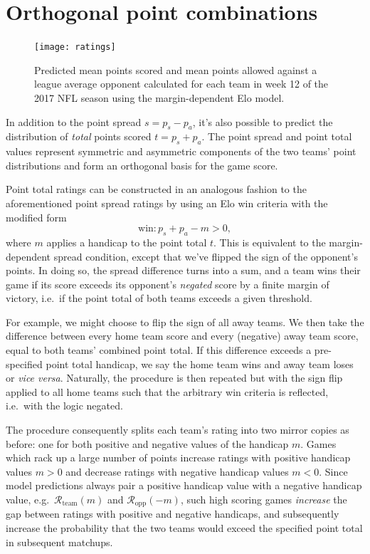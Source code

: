 \documentclass[aps,prc,reprint,amsmath,superscriptaddress]{revtex4-1}
\begin{document}
\section{Orthogonal point combinations}

\begin{figure}
  \texttt{[image: ratings]}
  \caption{\label{fig:ratings} Predicted mean points scored and mean points allowed against a league average opponent calculated for each team in week 12 of the 2017 NFL season using the margin-dependent Elo model.}
\end{figure}

In addition to the point spread $s = p_s - p_a$, it's also possible to predict the distribution of \emph{total} points scored $t = p_s + p_a$.
The point spread and point total values represent symmetric and asymmetric components of the two teams' point distributions and form an orthogonal basis for the game score. 

Point total ratings can be constructed in an analogous fashion to the aforementioned point spread ratings by using an Elo win criteria with the modified form
\begin{equation}
  \label{win_total}
  \text{win}: p_s + p_a - m > 0,
\end{equation}
where $m$ applies a handicap to the point total $t$.
This is equivalent to the margin-dependent spread condition, except that we've flipped the sign of the opponent's points.
In doing so, the spread difference turns into a sum, and a team wins their game if its score exceeds its opponent's \emph{negated} score by a finite margin of victory, i.e.\ if the point total of both teams exceeds a given threshold.

For example, we might choose to flip the sign of all away teams.
We then take the difference between every home team score and every (negative) away team score, equal to both teams' combined point total.
If this difference exceeds a pre-specified point total handicap, we say the home team wins and away team loses or \emph{vice versa}.
Naturally, the procedure is then repeated but with the sign flip applied to all home teams such that the arbitrary win criteria is reflected, i.e.\ with the logic negated.

The procedure consequently splits each team's rating into two mirror copies as before: one for both positive and negative values of the handicap $m$.
Games which rack up a large number of points increase ratings with positive handicap values $m > 0$ and decrease ratings with negative handicap values $m < 0$.
Since model predictions always pair a positive handicap value with a negative handicap value, e.g.\ $\mathcal{R}_\text{team}(m)$ and $\mathcal{R}_\text{opp}(-m)$, such high scoring games \emph{increase} the gap between ratings with positive and negative handicaps, and subsequently increase the probability that the two teams would exceed the specified point total in subsequent matchups.
\end{document}
